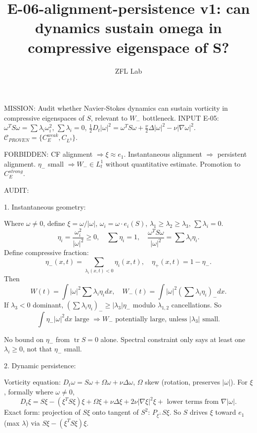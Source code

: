 \documentclass[11pt]{article}
\title{E-06-alignment-persistence v1: can dynamics sustain omega in compressive eigenspace of S?}
\author{ZFL Lab}
\begin{document}
\maketitle

MISSION: Audit whether Navier-Stokes dynamics can sustain vorticity in compressive eigenspaces of $S$, relevant to $W_-$ bottleneck.
INPUT E-05: $\omega^T S\omega=\sum\lambda_i\omega_i^2$, $\sum\lambda_i=0$, $\frac12 D_t|\omega|^2=\omega^T S\omega+\frac{\nu}{2}\Delta|\omega|^2-\nu|\nabla\omega|^2$. $\mathcal{C}_{PROVEN}=\{C_E^{weak},C_{L^3}\}$.

FORBIDDEN:
CF alignment $\Rightarrow\xi\approx e_1$.
Instantaneous alignment $\Rightarrow$ persistent alignment.
$\eta_-$ small $\Rightarrow W_-\in L^1_t$ without quantitative estimate.
Promotion to $C_E^{strong}$.

AUDIT:

1. Instantaneous geometry:

Where $\omega\neq0$, define $\xi=\omega/|\omega|$, $\omega_i=\omega\cdot e_i(S)$, $\lambda_1\ge\lambda_2\ge\lambda_3$, $\sum\lambda_i=0$.
\begin{equation*}
\eta_i=\frac{\omega_i^2}{|\omega|^2}\ge0,\quad\sum\eta_i=1,\quad \frac{\omega^T S\omega}{|\omega|^2}=\sum\lambda_i\eta_i.
\end{equation*}
Define compressive fraction:
\begin{equation*}
\boxed{\eta_-(x,t)=\sum_{\lambda_i(x,t)<0}\eta_i(x,t)},\quad \eta_+(x,t)=1-\eta_-.
\end{equation*}
Then
\begin{equation*}
W(t)=\int |\omega|^2\sum\lambda_i\eta_i dx,\quad W_-(t)=\int |\omega|^2(\sum\lambda_i\eta_i)_- dx.
\end{equation*}
If $\lambda_3<0$ dominant, $(\sum\lambda_i\eta_i)_-\ge |\lambda_3|\eta_-$ modulo $\lambda_{1,2}$ cancellations. So
\begin{equation*}
\int \eta_-|\omega|^2 dx \text{ large } \Rightarrow W_- \text{ potentially large, unless }|\lambda_3|\text{ small.}
\end{equation*}

No bound on $\eta_-$ from $\operatorname{tr}S=0$ alone. Spectral constraint only says at least one $\lambda_i\ge0$, not that $\eta_-$ small.

2. Dynamic persistence:

Vorticity equation: $D_t\omega=S\omega+\Omega\omega+\nu\Delta\omega$, $\Omega$ skew (rotation, preserves $|\omega|$).
For $\xi$, formally where $\omega\neq0$,
\begin{equation*}
D_t\xi = S\xi -(\xi^T S\xi)\xi + \Omega\xi + \nu\Delta\xi + 2\nu|\nabla\xi|^2\xi + \text{ lower terms from } \nabla|\omega|.
\end{equation*}
Exact form: projection of $S\xi$ onto tangent of $S^2$: $P_{\xi^\perp}S\xi$. So $S$ drives $\xi$ toward $e_1$ (max $\lambda$) via $S\xi-(\xi^T S\xi)\xi$.
\end{document}
